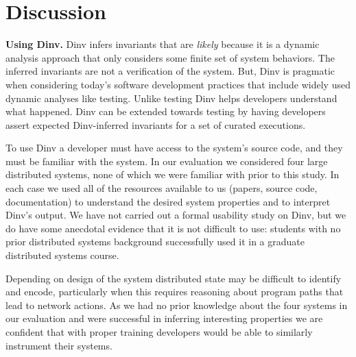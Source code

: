 \section{Discussion}
\label{sec:discussion}

\textbf{Using Dinv.} Dinv infers invariants that are \emph{likely}
because it is a dynamic analysis approach that only considers some
finite set of system behaviors. The inferred invariants are not a
verification of the system.
%
But, Dinv is pragmatic when considering today's software development
practices that include widely used dynamic analyses like testing.
%
Unlike testing Dinv helps developers understand what happened. Dinv
can be extended towards testing by having developers assert expected
Dinv-inferred invariants for a set of curated executions.



To use Dinv a developer must have access to the system's source code,
and they must be familiar with the system. In our evaluation we considered
four large distributed systems, none of which we were familiar with
prior to this study. In each case we used all of the resources
available to us (papers, source code, documentation) to understand the
desired system properties and to interpret Dinv's output. We have not
carried out a formal usability study on Dinv, but we do have some
anecdotal evidence that it is not difficult to use: students with no
prior distributed systems background successfully used it in a
graduate distributed systems course. 

%

Depending on design of the system distributed state may be difficult
to identify and encode, particularly when this requires reasoning
about program paths that lead to network actions.
%
As we had no prior knowledge about the four systems in our evaluation
and were successful in inferring interesting properties we are
confident that with proper training developers would be able to
similarly instrument their systems.
%

